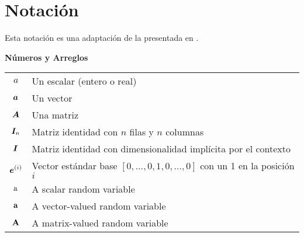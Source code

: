 \chapter*{Notación}
\label{notation}



\vspace{\notationgap}
{\begin{center} \large Esta notación es una adaptación de la presentada en \cite{deeplearning}.\end{center}}

\begin{minipage}{\textwidth}
  
\centerline{\bf Números y Arreglos}
\bgroup
\def\arraystretch{1.5}
\begin{tabular}{cp{3.25in}}
$\displaystyle a$ & Un escalar (entero o real)\\
$\displaystyle {\bm{a}}$ & Un vector\\
$\displaystyle {\bm{A}}$ & Una matriz\\
$\displaystyle {\bm{I}}_n$ & Matriz identidad con $n$ filas y $n$ columnas\\
$\displaystyle {\bm{I}}$ & Matriz identidad con dimensionalidad implícita por el contexto\\
$\displaystyle {\bm{e}}^{(i)}$ & Vector estándar base $[0,\dots,0,1,0,\dots,0]$ con un 1 en la posición $i$\\
$\displaystyle {\textnormal{a}}$ & A scalar random variable\\
$\displaystyle {\mathbf{a}}$ & A vector-valued random variable\\
$\displaystyle {\mathbf{A}}$ & A matrix-valued random variable\\
\end{tabular}
\egroup
{}
\end{minipage}

